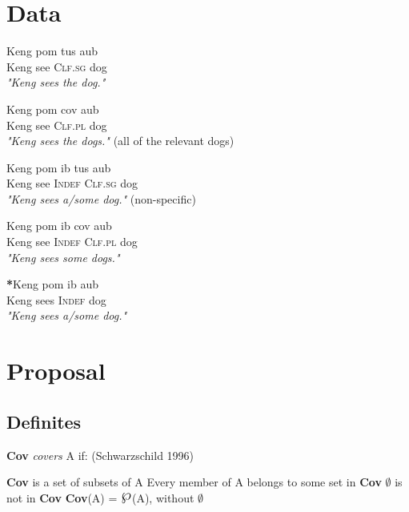 \documentclass[a4paper,11pt]{article}
\newcommand{\powerset}{\raisebox{.15\baselineskip}{\Large\ensuremath{\wp}}}
\begin{document}
\section{Data}

\begin{exe}
\ex \gll Keng pom tus aub \\
	Keng see \textsc{Clf.sg} dog \\
\glt \textit{"Keng sees the dog."}
\end{exe}

\begin{exe}
\ex \gll Keng pom cov aub \\
	Keng see \textsc{Clf.pl} dog \\
\glt \textit{"Keng sees the dogs."} (all of the relevant dogs)
\end{exe}

\begin{exe}
\ex \gll Keng pom ib tus aub \\
	Keng see \textsc{Indef} \textsc{Clf.sg} dog \\
\glt \textit{"Keng sees a/some dog."} (non-specific)
\end{exe}

\begin{exe}
\ex \gll Keng pom ib cov aub \\
	Keng see \textsc{Indef} \textsc{Clf.pl} dog \\
\glt \textit{"Keng sees some dogs."}
\end{exe}

\begin{exe}
\ex \gll \textbf{*}Keng pom ib aub \\
	Keng sees \textsc{Indef} dog \\
\glt \textit{"Keng sees a/some dog."}
\end{exe}




\section{Proposal}

\subsection{Definites}


\begin{exe}
\ex \textbf{Cov} \textit{covers} A if: (Schwarzschild 1996) \begin{xlist}
\ex \textbf{Cov} is a set of subsets of A 
\ex Every member of A belongs to some set in \textbf{Cov} 
\ex $\emptyset$ is not in \textbf{Cov} 
\ex \textbf{Cov}(A) = $\powerset$(A), without $\emptyset$
\end{xlist}
\end{exe}
\end{document}
